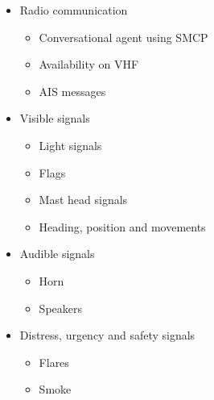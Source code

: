 \begin{itemize}
	\item Radio communication
	\begin{itemize}
		\item Conversational agent using \acf{SMCP}
		\item Availability on \acf{VHF}
		\item \acf{AIS} messages
	\end{itemize}
	\item Visible signals
	\begin{itemize}
		\item Light signals
		\item Flags
		\item Mast head signals
		\item Heading, position and movements
	\end{itemize}
	\item Audible signals
	\begin{itemize}
		\item Horn
		\item Speakers
	\end{itemize}
	\item Distress, urgency and safety signals
	\begin{itemize}
		\item Flares
		\item Smoke
	\end{itemize}
\end{itemize}